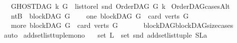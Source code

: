 \begin{isabellebody}
\ \ \ {\isachardoublequoteopen}GHOSTDAG\ k\ G\ {\isacharequal}{\kern0pt}\ list{\isacharunderscore}{\kern0pt}to{\isacharunderscore}{\kern0pt}rel\ {\isacharparenleft}{\kern0pt}snd\ {\isacharparenleft}{\kern0pt}OrderDAG\ G\ k{\isacharparenright}{\kern0pt}{\isacharparenright}{\kern0pt}{\isachardoublequoteclose}%
\isadelimdocument
%
\endisadelimdocument
%
\isatagdocument
%
\isamarkuptrue%
%
\endisatagdocument
{\isafolddocument}%
%
\isadelimdocument
%
\endisadelimdocument
{}\isamarkupfalse%
\ OrderDAG{\isacharunderscore}{\kern0pt}casesAlt{\isacharcolon}{\kern0pt}\isanewline
\ \ \ {\isacharparenleft}{\kern0pt}ntB{\isacharparenright}{\kern0pt}\ {\isachardoublequoteopen}{\isasymnot}\ blockDAG\ G{\isachardoublequoteclose}\ \isanewline
\ \ {\isacharbar}{\kern0pt}\ {\isacharparenleft}{\kern0pt}one{\isacharparenright}{\kern0pt}\ {\isachardoublequoteopen}blockDAG\ G\ {\isasymand}\ card\ {\isacharparenleft}{\kern0pt}verts\ G{\isacharparenright}{\kern0pt}\ {\isacharequal}{\kern0pt}\ {}{\isachardoublequoteclose}\isanewline
\ \ {\isacharbar}{\kern0pt}\ {\isacharparenleft}{\kern0pt}more{\isacharparenright}{\kern0pt}\ {\isachardoublequoteopen}blockDAG\ G\ {\isasymand}\ card\ {\isacharparenleft}{\kern0pt}verts\ G{\isacharparenright}{\kern0pt}\ {\isachargreater}{\kern0pt}\ {}{\isachardoublequoteclose}\isanewline
%
\isadelimproof
\ \ %
\endisadelimproof
%
\isatagproof
{}\isamarkupfalse%
\ \ blockDAG{\isachardot}{\kern0pt}blockDAG{\isacharunderscore}{\kern0pt}size{\isacharunderscore}{\kern0pt}cases\ \isamarkupfalse%
\ auto%
\endisatagproof
{\isafoldproof}%
%
\isadelimproof
%
\endisadelimproof
%
\isadelimdocument
%
\endisadelimdocument
%
\isatagdocument
%
\isamarkuptrue%
%
\endisatagdocument
{\isafolddocument}%
%
\isadelimdocument
%
\endisadelimdocument
{}\isamarkupfalse%
\ add{\isacharunderscore}{\kern0pt}set{\isacharunderscore}{\kern0pt}list{\isacharunderscore}{\kern0pt}tuple{\isacharunderscore}{\kern0pt}mono{\isacharcolon}{\kern0pt}\isanewline
\ \ \ {\isachardoublequoteopen}set\ L\ {\isasymsubseteq}\ set\ {\isacharparenleft}{\kern0pt}snd\ {\isacharparenleft}{\kern0pt}add{\isacharunderscore}{\kern0pt}set{\isacharunderscore}{\kern0pt}list{\isacharunderscore}{\kern0pt}tuple\ {\isacharparenleft}{\kern0pt}{\isacharparenleft}{\kern0pt}S{\isacharcomma}{\kern0pt}L{\isacharparenright}{\kern0pt}{\isacharcomma}{\kern0pt}a{\isacharparenright}{\kern0pt}{\isacharparenright}{\kern0pt}{\isacharparenright}{\kern0pt}{\isachardoublequoteclose}\isanewline

\end{isabellebody}
